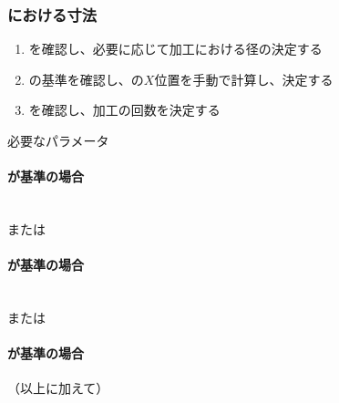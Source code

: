 \clearpage
\subsubsection{\KeywayMilling における寸法}
\begin{enumerate}[label=\sarrow]
\item \KeywayType を確認し、必要に応じて加工における径の決定する
\item {}\nameKeywayCenter の基準を確認し、\KeywayCenter の$X$位置を手動で計算し、決定する
\item \KeywayWidth を確認し、加工の回数を決定する
\end{enumerate}
\begin{Parameter}{必要なパラメータ}
\paragraph*{\CenterCurvatureLine が基準の場合}
\PMKeywayACOD
\PMKeywayBDOD
\PMKeywayPos
\PMKeywayWidth
\PMCenterCurvatureRadius\\
\PMKeywayCornerR または\PMKeywayCornerC
\tcbline*
\paragraph*{\OutcutCenter が基準の場合}
\PMKeywayACOD
\PMKeywayBDOD
\PMKeywayPos
\PMKeywayWidth\\
\PMKeywayCornerR または\PMKeywayCornerC
\tcbline*
\paragraph*{\AsideKeywayDepth が基準の場合}
（以上に加えて）\PMAsideKeywayDepth
\end{Parameter}

\clearpage
